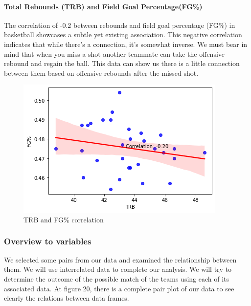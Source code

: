 \documentclass[conference]{IEEEtran}
\begin{document}
\paragraph {Total Rebounds (TRB) and Field Goal Percentage(FG\%)}
The correlation of -0.2 between rebounds and field goal percentage (FG\%) in basketball showcases a subtle yet existing association. This negative correlation indicates that while there's a connection, it's somewhat inverse. We must bear in mind that when you miss a shot another teammate can take the offensive rebound and regain the ball. This data can show us there is a little connection between them based on offensive rebounds after the missed shot.
\vspace{\baselineskip}

\begin{figure}[h]
    \centering
    \includegraphics[scale=0.6]{TRB-FG-COR.png}
    \caption{TRB and FG\% correlation}
    \label{fig:enter-label}
\end{figure}
\vspace{\baselineskip}
\vspace{\baselineskip}
\vspace{\baselineskip}
\vspace{\baselineskip}


\subsubsection{Overview to variables}
We selected some pairs from our data and examined the
relationship between them. We will use interrelated data to
complete our analysis. We will try to determine the outcome
of the possible match of the teams using each of its associated
data. At figure 20, there is a complete pair plot of our data to
see clearly the relations between data frames.
\end{document}
